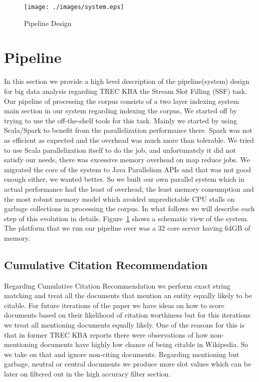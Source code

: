 
\begin{figure}[b]
\centering
\texttt{[image: ./images/system.eps]}
\vspace*{-.1in} \caption{Pipeline Design }\label{fig:system}
\vspace*{-.2in}
\end{figure}

\section{Pipeline}

In this section we provide a high level description of the pipeline(system) 
design for big data analysis regarding TREC KBA the Stream Slot Filling (SSF) 
task. Our pipeline of processing the corpus consists of a two layer indexing 
system main section in our system regarding indexing the corpus, We started 
off by trying to use the off-the-shelf tools for this task. Mainly we started 
by using Scala/Spark\cite{ferc11} to benefit from the parallelization 
performance there.  Spark was not as efficient as expected and the overhead 
was much more than tolerable. We tried to use Scala parallelization itself to 
do the job, and unfortunately it did not satisfy our needs, there was 
excessive memory overhead on map reduce jobs. We migrated the core of the 
system to Java Parallelism APIs and that was not good enough either, we wanted 
better. So we built our own parallel system which in actual performance had 
the least of overhead, the least memory consumption and the most robust memory 
model which avoided unpredictable CPU stalls on garbage collections in 
processing the corpus. In what follows we will describe each step of this 
evolution in details. Figure~\ref{fig:system} shows a schematic view of the 
system. The platform that we run our pipeline over was a 32 core server having 
64GB of memory.





\subsection{Cumulative Citation Recommendation}

Regarding Cumulative Citation Recommendation we perform exact string matching 
and treat all the documents that mention an entity equally likely to be citable.
For future iterations of the paper we have ideas on how to score documents 
based on their likelihood of citation worthiness but for this iterations we 
treat all mentioning documents equally likely. One of the reasons for this is 
that in former TREC KBA reports \cite{JFrank12} there were observations of how 
non-mentioning documents have highly low chance of being citable in Wikipedia.
So we take on that and ignore non-citing documents. Regarding mentioning but 
garbage, neutral or central documents we produce more slot values which can be 
later on filtered out in the high accuracy filter section.

